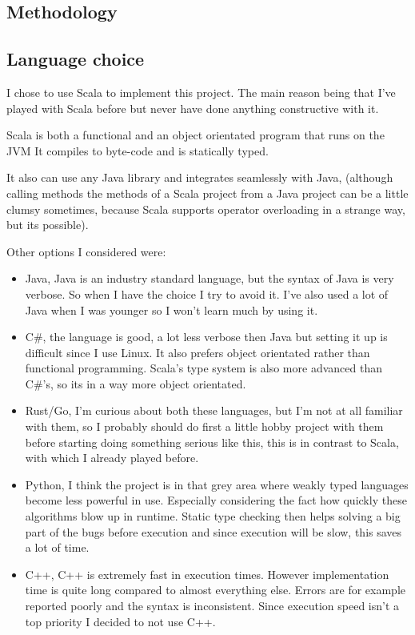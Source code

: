 \documentclass{article}
\begin{document}
\begin{empfile}
\section{Methodology}

\subsection{Language choice}
I chose to use Scala to implement this project. The main reason being that I've
played with Scala before but never have done anything constructive with it.

Scala is both a functional and an object orientated program that runs on the JVM
It compiles to byte-code and is statically typed.

It also can use any Java library and integrates seamlessly with Java, (although
calling methods the methods of a Scala project from a Java project can be
a little clumsy sometimes, because Scala supports operator overloading in
a strange way, but its possible).

Other options I considered were:
\begin{itemize}
	\item Java, Java is an industry standard language, but the syntax of
		Java is very verbose. So when I have the choice I try to avoid it.
		I've also used a lot of Java when I was younger so I won't learn
		much by using it.
	\item C\#, the language is good, a lot less verbose then Java
		but setting it up is difficult since I use Linux.
		It also prefers object orientated rather than
		functional programming. Scala's type system is also more advanced than
		C\#'s, so its in a way more object orientated.
	\item Rust/Go, I'm curious about both these languages, but I'm not at
		all familiar with them, so I probably should do first a little
		hobby project with them before starting doing something serious like
		this, this is in contrast to Scala, with which I already played before.
	\item Python, I think the project is in that grey area where weakly
		typed languages become less powerful in use. Especially considering
		the fact how quickly these algorithms blow up in runtime. Static type
		checking then helps solving a big part of the bugs before execution
		and since execution will be slow, this saves a lot of time.
	\item C++, C++ is extremely fast in execution times. However implementation
		time is quite long compared to almost everything else.
		Errors are for example reported poorly and
		the syntax is inconsistent. Since execution speed isn't a top priority
		I decided to not use C++.
\end{itemize}


\end{empfile}
\end{document}
